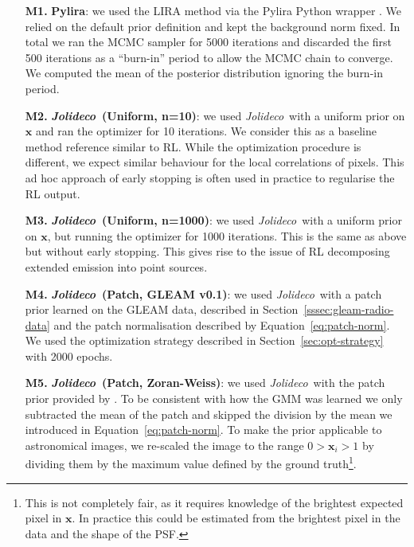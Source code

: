 \documentclass[twocolumn]{aastex631}
\newcommand{\jolideco}{\textit{Jolideco}~}
\begin{document}
    \begin{enumerate}

        \item[\bf M1.] \textbf{Pylira}: we used the LIRA method \citep{Esch2004} via the Pylira Python wrapper \citep{Donath2022}. We relied on the default prior definition and kept the background norm fixed. In total we ran the MCMC sampler for 5000 iterations and discarded the first 500 iterations as a \enquote{burn-in} period to allow the MCMC chain to converge. We computed the mean of the posterior distribution ignoring the burn-in period.
        
        \item[\bf M2.] \textbf{\jolideco (Uniform, n=10)}: we used \jolideco with a uniform prior on $\mathbf{x}$ and ran the optimizer for 10 iterations. We consider this as a baseline method reference similar to RL. While the optimization procedure is different, we expect similar behaviour for the local correlations of pixels. This ad hoc approach of early stopping is often used in practice to regularise the RL output.
        
        \item[\bf M3.] \textbf{\jolideco (Uniform, n=1000)}:  we used \jolideco with a uniform prior on $\mathbf{x}$, but running the optimizer for 1000 iterations. This is the same as above but without early stopping. This gives rise to the issue of RL decomposing extended emission into point sources.
        
        \item[\bf M4.] \textbf{\jolideco (Patch, GLEAM v0.1)}: we used \jolideco with a patch prior learned on the GLEAM data, described in Section~\ref{sssec:gleam-radio-data} and the patch normalisation described by Equation~\ref{eq:patch-norm}. We used the optimization strategy described in Section~\ref{sec:opt-strategy} with 2000 epochs.
        
        \item[\bf M5.] \textbf{\jolideco (Patch, Zoran-Weiss)}: we used \jolideco with the patch prior provided by \cite{Zoran2011}. To be consistent with how the GMM was learned we only subtracted the mean of the patch and skipped the division by the mean we introduced in Equation~\ref{eq:patch-norm}. To make the prior applicable to astronomical images, we re-scaled the image to the range $0 > \mathbf{x}_i > 1$ by dividing them by the maximum value defined by the ground truth\footnote{This is not completely fair, as it requires knowledge of the brightest expected pixel in $\mathbf{x}$. In practice this could be estimated from the brightest pixel in the data and the shape of the PSF.}.
    \end{enumerate}
\end{document}
